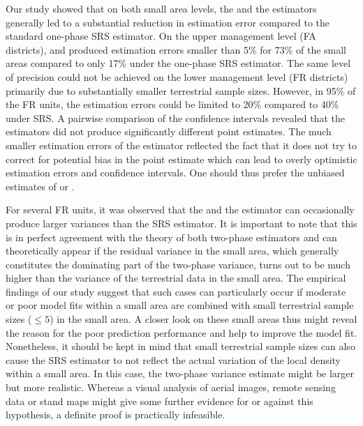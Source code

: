 Our study showed that on both small area levels, the \psmall{} and the \extpsynth{} estimators generally led to a substantial reduction in estimation error compared to the standard one-phase SRS estimator. On the upper management level (FA districts), \psmall{} and \extpsynth{} produced estimation errors smaller than 5\% for 73\% of the small areas compared to only 17\% under the one-phase SRS estimator. The same level of precision could not be achieved on the lower management level (FR districts) primarily due to substantially smaller terrestrial sample sizes. However, in 95\% of the FR units, the estimation errors could be limited to 20\% compared to 40\% under SRS. A pairwise comparison of the confidence intervals revealed that the estimators did not produce significantly different point estimates. The much smaller estimation errors of the \psynth{} estimator reflected the fact that it does not try to correct for potential bias in the point estimate which can lead to overly optimistic estimation errors and confidence intervals. One should thus prefer the unbiased estimates of \psmall{} or \extpsynth{}.\par

For several FR units, it was observed that the \psmall{} and the \extpsynth{} estimator can occasionally produce larger variances than the SRS estimator. It is important to note that this is in perfect agreement with the theory of both two-phase estimators and can theoretically appear if the residual variance in the small area, which generally constitutes the dominating part of the two-phase variance, turns out to be much higher than the variance of the terrestrial data in the small area. The empirical findings of our study suggest that such cases can particularly occur if moderate or poor model fits within a small area are combined with small terrestrial sample sizes ($\leq 5$) in the small area. A closer look on these small areas thus might reveal the reason for the poor prediction performance and help to improve the model fit. Nonetheless, it should be kept in mind that small terrestrial sample sizes can also cause the SRS estimator to not reflect the actual variation of the local density within a small area. In this case, the two-phase variance estimate might be larger but more realistic. Whereas a visual analysis of aerial images, remote sensing data or stand maps might give some further evidence for or against this hypothesis, a definite proof is practically infeasible.\par

